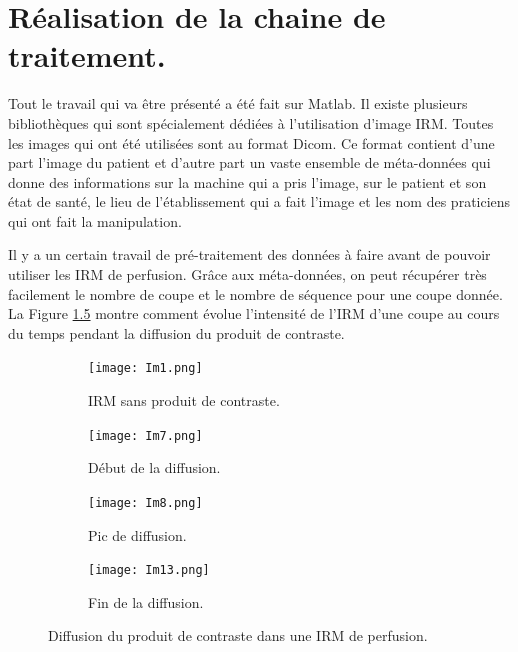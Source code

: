 \chapter{Réalisation de la chaine de traitement.}

Tout le travail qui va être présenté a été fait sur Matlab. Il existe plusieurs bibliothèques qui sont spécialement dédiées à l'utilisation d'image IRM. Toutes les images qui ont été utilisées sont au format Dicom. Ce format contient d'une part l'image du patient et d'autre part un vaste ensemble de méta-données qui donne des informations sur la machine qui a pris l'image, sur le patient et son état de santé, le lieu de l'établissement qui a fait l'image et les nom des praticiens qui ont fait la manipulation.

\medskip

Il y a un certain travail de pré-traitement des données à faire avant de pouvoir utiliser les IRM de perfusion. Grâce aux méta-données, on peut récupérer très facilement le nombre de coupe et le nombre de séquence pour une coupe donnée. La Figure \ref{fig:diffusion} montre comment évolue l'intensité de l'IRM d'une coupe au cours du temps pendant la diffusion du produit de contraste.


\begin{figure}[H]
\centering
\begin{subfigure}[t]{0.3\textwidth}
\centering
    \vspace{0.00\textheight}
    \texttt{[image: Im1.png]}
    \caption{IRM sans produit de contraste.}
    \label{fig:without} 
\end{subfigure}
\begin{subfigure}[t]{0.3\textwidth}
\centering
    \vspace{0.00\textheight}
    \texttt{[image: Im7.png]}
    \caption{Début de la diffusion.}
    \label{fig:First} 
\end{subfigure}
\begin{subfigure}[t]{0.3\textwidth}
\centering
    \vspace{0.00\textheight}
    \texttt{[image: Im8.png]}
    \caption{Pic de diffusion.}
    \label{fig:Second} 
\end{subfigure}
\begin{subfigure}[t]{0.3\textwidth}
\centering
    \vspace{0.00\textheight}
    \texttt{[image: Im13.png]}
    \caption{Fin de la diffusion.}
    \label{fig:Last} 
\end{subfigure}
    \caption{Diffusion du produit de contraste dans une IRM de perfusion.}
    \label{fig:diffusion} 
\end{figure}


